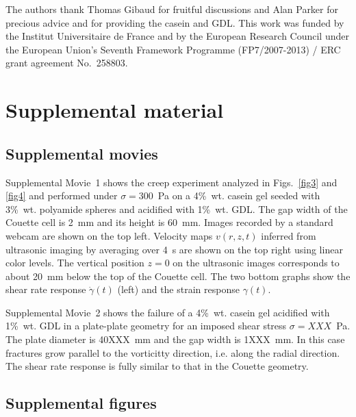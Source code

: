 \documentclass[twocolumn,superscriptaddress,showpacs,preprintnumbers,amsmath,amssymb,prl]{revtex4}
\newcommand\gp{\dot\gamma}
\begin{document}
\begin{acknowledgments}
The authors thank Thomas Gibaud for fruitful discussions and Alan Parker for precious advice and for providing the casein and GDL. This work was funded by the Institut Universitaire de France and by the European Research Council under the European Union's Seventh Framework Programme (FP7/2007-2013) / ERC grant agreement No.~258803. 
\end{acknowledgments}

 
%

\clearpage
\newpage
\setcounter{figure}{0}

\section*{\large Supplemental material}

\subsection*{Supplemental movies}

Supplemental Movie~1 shows the creep experiment analyzed in Figs.~\ref{fig3} and \ref{fig4} and performed under $\sigma=300$~Pa on a 4\%~wt. casein gel seeded with 3\%~wt. polyamide spheres and acidified with 1\%~wt. GDL. The gap width of the Couette cell is 2~mm and its height is 60~mm. Images recorded by a standard webcam are shown on the top left. Velocity maps $v(r,z,t)$ inferred from ultrasonic imaging by averaging over 4~s are shown on the top right using linear color levels. The vertical position $z=0$ on the ultrasonic images corresponds to about 20~mm below the top of the Couette cell. The two bottom graphs show the shear rate response $\gp(t)$ (left) and the strain response $\gamma(t)$.

Supplemental Movie~2 shows the failure of a 4\%~wt. casein gel acidified with 1\%~wt. GDL in a plate-plate geometry for an imposed shear stress $\sigma=XXX$~Pa. The plate diameter is 40XXX~mm and the gap width is 1XXX~mm. In this case fractures grow parallel to the vorticitty direction, i.e. along the radial direction. The shear rate response is fully similar to that in the Couette geometry.

\subsection*{Supplemental figures} 
\end{document}
